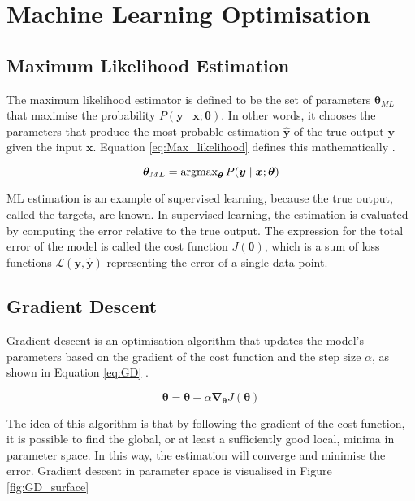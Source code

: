 \chapter{Machine Learning Optimisation}

\section{Maximum Likelihood Estimation}


The maximum likelihood estimator is defined to be the set of parameters $\bm{\theta}_{ML}$ that maximise the probability $P(\bm{y} \mid \bm{x}; \bm{\theta})$.
In other words, it chooses the parameters that produce the most probable estimation $\bm{\widehat{y}}$ of the true output $\bm{y}$ given the input $\bm{x}$.
Equation \eqref{eq:Max_likelihood} defines this mathematically \cite{Goodfellow-et-al-2016}.

\begin{equation}\label{eq:Max_likelihood}
    \bm{\theta}_{ML} = \operatorname{argmax}_{\bm{\theta}} P(\bm{y} \mid \bm{x}; \bm{\theta})
\end{equation}

ML estimation is an example of supervised learning, because the true output, called the targets, are known.
In supervised learning, the estimation is evaluated by computing the error relative to the true output.
The expression for the total error of the model is called the cost function $J(\bm{\theta})$,
which is a sum of loss functions $\mathcal{L}(\bm{y},\bm{\widehat{y}} )$ representing the error of a single data point.

\section{Gradient Descent}

Gradient descent is an optimisation algorithm that updates the model's parameters based on the gradient of the cost function and the step size $\alpha$,
as shown in Equation \eqref{eq:GD} \cite{ruder2016overview}.

\begin{equation}\label{eq:GD}
    \bm{\theta} = \bm{\theta} - \alpha \bm{\nabla_{\theta}} J(\bm{\theta})
\end{equation}

The idea of this algorithm is that by following the gradient of the cost function, it is possible to find the global,
or at least a sufficiently good local, minima in parameter space.
In this way, the estimation will converge and minimise the error.
Gradient descent in parameter space is visualised in Figure \ref{fig:GD_surface}

